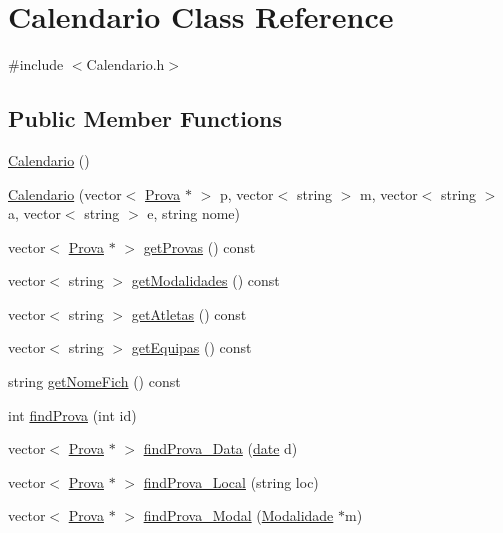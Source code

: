 \hypertarget{class_calendario}{}\section{Calendario Class Reference}
\label{class_calendario}


{\ttfamily \#include $<$Calendario.\+h$>$}

\subsection*{Public Member Functions}
\begin{DoxyCompactItemize}
\item 
\hyperlink{class_calendario_a2aa60aa6d3c27f696018cc09d2748ea5}{Calendario} ()
\item 
\hyperlink{class_calendario_a5dd6d18ea3711495912ba913c3b08c24}{Calendario} (vector$<$ \hyperlink{class_prova}{Prova} $\ast$ $>$ p, vector$<$ string $>$ m, vector$<$ string $>$ a, vector$<$ string $>$ e, string nome)
\item 
vector$<$ \hyperlink{class_prova}{Prova} $\ast$ $>$ \hyperlink{class_calendario_a614b94b28d14852af27b60c49342b52c}{get\+Provas} () const 
\item 
vector$<$ string $>$ \hyperlink{class_calendario_aa92791918d953f34250063a67d0d6232}{get\+Modalidades} () const 
\item 
vector$<$ string $>$ \hyperlink{class_calendario_abfc38a3a96e33ec237496ed83c3259a5}{get\+Atletas} () const 
\item 
vector$<$ string $>$ \hyperlink{class_calendario_aff13d470983e46172aca04dda560332d}{get\+Equipas} () const 
\item 
string \hyperlink{class_calendario_a8ec3b8d1862fc893922561d97e4341cb}{get\+Nome\+Fich} () const 
\item 
int \hyperlink{class_calendario_a0232407ed153d613706113bad31d63ab}{find\+Prova} (int id)
\item 
vector$<$ \hyperlink{class_prova}{Prova} $\ast$ $>$ \hyperlink{class_calendario_acb99bce549da591f00766bde187c6ec2}{find\+Prova\+\_\+\+Data} (\hyperlink{structdate}{date} d)
\item 
vector$<$ \hyperlink{class_prova}{Prova} $\ast$ $>$ \hyperlink{class_calendario_a793b4bc54543406742b0fcd16bd95c26}{find\+Prova\+\_\+\+Local} (string loc)
\item 
vector$<$ \hyperlink{class_prova}{Prova} $\ast$ $>$ \hyperlink{class_calendario_a4213931fe492f55a4b6981c3dca02479}{find\+Prova\+\_\+\+Modal} (\hyperlink{class_modalidade}{Modalidade} $\ast$m)

\end{DoxyCompactItemize}
